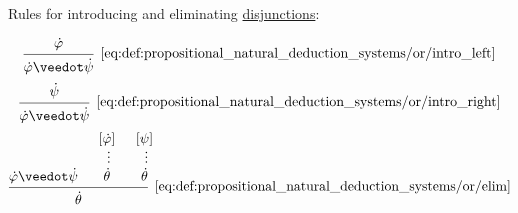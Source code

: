 \begin{definition}
\begin{thmenum}
     Rules for introducing and eliminating \hyperref[def:propositional_alphabet/connectives/disjunction]{disjunctions}:
    \begin{ThreeColumns}
      \begin{equation*}\taglabel[\( \vee^{+_L} \)]{eq:def:propositional_natural_deduction_systems/or/intro_left}
        \begin{prooftree}
          \hypo{ \syn\varphi }
          \infer1[\ref{eq:def:propositional_natural_deduction_systems/or/intro_left}]{ \syn\varphi \synvee \syn\psi }
        \end{prooftree}
      \end{equation*}
    \BeginSecondColumn
      \begin{equation*}\taglabel[\( \vee^{+_R} \)]{eq:def:propositional_natural_deduction_systems/or/intro_right}
        \begin{prooftree}
          \hypo{ \syn\psi }
          \infer1[\ref{eq:def:propositional_natural_deduction_systems/or/intro_right}]{ \syn\varphi \synvee \syn\psi }
        \end{prooftree}
      \end{equation*}
    \BeginThirdColumn
      \begin{equation*}\taglabel[\( \vee^- \)]{eq:def:propositional_natural_deduction_systems/or/elim}
        \begin{prooftree}
          \hypo{ \syn\varphi \synvee \syn\psi }
          \hypo{ [\syn\varphi] }
          \ellipsis {} { \syn\theta }
          \hypo{ [\psi] }
          \ellipsis {} { \syn\theta }
          \infer3[\ref{eq:def:propositional_natural_deduction_systems/or/elim}]{ \syn\theta }
        \end{prooftree}
      \end{equation*}
    \end{ThreeColumns}


\end{thmenum}
\end{definition}
